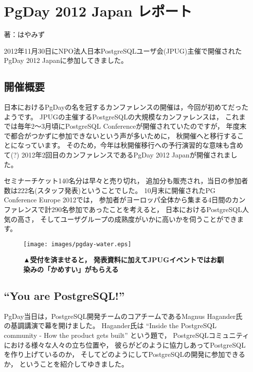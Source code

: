 
\chapter{PgDay 2012 Japan レポート}

\begin{flushright}
 {\headfont 著：はやみず}
\end{flushright}

2012年11月30日にNPO法人日本PostgreSQLユーザ会(JPUG)主催で開催されたPgDay 2012 Japanに参加してきました。

\section{開催概要}

日本におけるPgDayの名を冠するカンファレンスの開催は，今回が初めてだったようです。
JPUGの主催するPostgreSQLの大規模なカンファレンスは，
これまでは毎年2〜3月頃にPostgreSQL Conferenceが開催されていたのですが，
年度末で都合がつかずに参加できないという声が多いために，
秋開催へと移行することになっています。
そのため，今年は秋開催移行への予行演習的な意味も含めて(?)
2012年2回目のカンファレンスであるPgDay 2012 Japanが開催されました。

セミナーチケット140名分は早々と売り切れ，
追加分も販売され，当日の参加者数は222名(スタッフ発表)ということでした。
10月末に開催されたPG Conference Europe 2012では，
参加者がヨーロッパ全体から集まる4日間のカンファレンスで計290名参加であったことを考えると，
日本におけるPostgreSQL人気の高さ，
そしてユーザグループの成熟度がいかに高いかを伺うことができます。

\begin{figure}[tb]
 \begin{center}
  \texttt{[image: images/pgday-water.eps]}\par
  \noindent 
{\bf ▲受付を済ませると，
  発表資料に加えてJPUGイベントではお馴染みの「かめすい」がもらえる}
 \end{center}
\end{figure}

\section{``You are PostgreSQL!''}

PgDay当日は，PostgreSQL開発チームのコアチームであるMagnus Hagander氏の基調講演で幕を開けました。
Hagander氏は ``Inside the PostgreSQL community - How the product gets built'' という題で，
PostgreSQLコミュニティにおける様々な人々の立ち位置や，
彼らがどのように協力しあってPostgreSQLを作り上げているのか，
そしてどのようにしてPostgreSQLの開発に参加できるか，
ということを紹介してゆきました。

